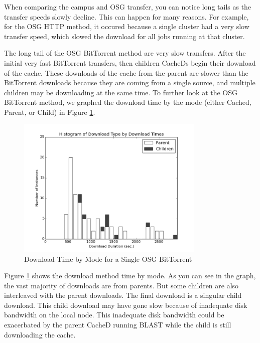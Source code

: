 When comparing the campus and OSG transfer, you can notice long tails as the transfer speeds slowly decline.  This can happen for many reasons.  For example, for the OSG HTTP method, it occured because a single cluster had a very slow transfer speed, which slowed the download for all jobs running at that cluster.

The long tail of the OSG BitTorrent method are very slow transfers.  After the initial very fast BitTorrent transfers,  then children CacheDs begin their download of the cache.  These downloads of the cache from the parent are slower than the BitTorrent downloads because they are coming from a single source, and multiple children may be downloading at the same time.  To further look at the OSG BitTorrent method, we graphed the download time by the mode (either Cached, Parent, or Child) in Figure \ref{fig:dowloadmodebittorrent}.

\begin{figure}[h!t]
\centering
\includegraphics[width=0.8\textwidth]{images/osg-aggregatebittorrentmodes-grayscale.png}
\caption{Download Time by Mode for a Single OSG BitTorrent}
\label{fig:dowloadmodebittorrent}
\end{figure}

Figure \ref{fig:dowloadmodebittorrent} shows the download method time by mode.  As you can see in the graph, the vast majority of downloads are from parents.  But some children are also interleaved with the parent downloads.  The final download is a singular child download.  This child download may have gone slow because of inadequate disk bandwidth on the local node.  This inadequate disk bandwidth could be exacerbated by the parent CacheD running BLAST while the child is still downloading the cache.



